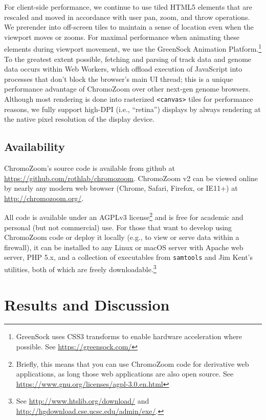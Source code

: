For client-side performance, we continue to use tiled HTML5 elements that are rescaled and moved in accordance with user pan, zoom, and throw operations. We prerender into off-screen tiles to maintain a sense of location even when the viewport moves or zooms. For maximal performance when animating these elements during viewport movement, we use the GreenSock Animation Platform.\footnote{GreenSock uses CSS3 transforms to enable hardware acceleration where possible. See \url{https://greensock.com/}} To the greatest extent possible, fetching and parsing of track data and genome data occurs within Web Workers, which offload execution of JavaScript into processes that don't block the browser's main UI thread; this is a unique performance advantage of ChromoZoom over other next-gen genome browsers.\autocite{Buels2016,Down2011,Vanderkam2016} Although most rendering is done into rasterized \texttt{<canvas>} tiles for performance reasons, we fully support high-DPI (i.e., ``retina'') displays by always rendering at the native pixel resolution of the display device.

\subsection{Availability}

ChromoZoom's source code is available from github at \url{https://github.com/rothlab/chromozoom}. ChromoZoom v2 can be viewed online by nearly any modern web browser (Chrome, Safari, Firefox, or IE11+) at \url{http://chromozoom.org/}.

All code is available under an AGPLv3 license\footnote{Briefly, this means that you can use ChromoZoom code for derivative web applications, as long those web applications are also open source. See \url{https://www.gnu.org/licenses/agpl-3.0.en.html}} and is free for academic and personal (but not commercial) use. For those that want to develop using ChromoZoom code or deploy it locally (e.g., to view or serve data within a firewall), it can be installed to any Linux or macOS server with Apache web server, PHP 5.x, and a collection of executables from \texttt{samtools} and Jim Kent's utilities, both of which are freely downloadable.\footnote{See \url{http://www.htslib.org/download/} and \url{http://hgdownload.cse.ucsc.edu/admin/exe/}.}

\section{Results and Discussion}

